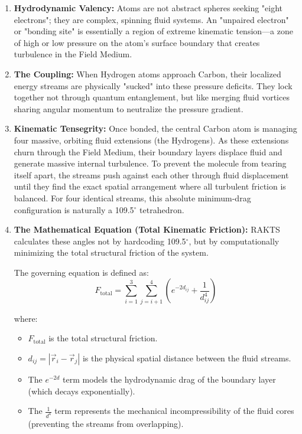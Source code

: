 \documentclass[reprint,amsmath,amssymb,aps,prd,twocolumn]{revtex4-2}
\begin{document}
\begin{enumerate}
    \item \textbf{Hydrodynamic Valency:} Atoms are not abstract spheres seeking "eight electrons"; they are complex, spinning fluid systems. An "unpaired electron" or "bonding site" is essentially a region of extreme kinematic tension—a zone of high or low pressure on the atom's surface boundary that creates turbulence in the Field Medium.
    \item \textbf{The Coupling:} When Hydrogen atoms approach Carbon, their localized energy streams are physically "sucked" into these pressure deficits. They lock together not through quantum entanglement, but like merging fluid vortices sharing angular momentum to neutralize the pressure gradient.
    \item \textbf{Kinematic Tensegrity:} Once bonded, the central Carbon atom is managing four massive, orbiting fluid extensions (the Hydrogens). As these extensions churn through the Field Medium, their boundary layers displace fluid and generate massive internal turbulence. To prevent the molecule from tearing itself apart, the streams push against each other through fluid displacement until they find the exact spatial arrangement where all turbulent friction is balanced. For four identical streams, this absolute minimum-drag configuration is naturally a 109.5$^\circ$ tetrahedron.
    \item \textbf{The Mathematical Equation (Total Kinematic Friction):} RAKTS calculates these angles not by hardcoding 109.5$^\circ$, but by computationally minimizing the total structural friction of the system. 

    The governing equation is defined as:
    \[
    F_{\text{total}} = \sum_{i=1}^{3} \sum_{j=i+1}^{4} \left( e^{-2d_{ij}} + \frac{1}{d_{ij}^4} \right)
    \]

    where:
    \begin{itemize}
        \item $F_{\text{total}}$ is the total structural friction.
        \item $d_{ij} = |\vec{r}_i - \vec{r}_j|$ is the physical spatial distance between the fluid streams.
        \item The $e^{-2d}$ term models the hydrodynamic drag of the boundary layer (which decays exponentially).
        \item The $\frac{1}{d^4}$ term represents the mechanical incompressibility of the fluid cores (preventing the streams from overlapping).
    \end{itemize}


\end{enumerate}
\end{document}

